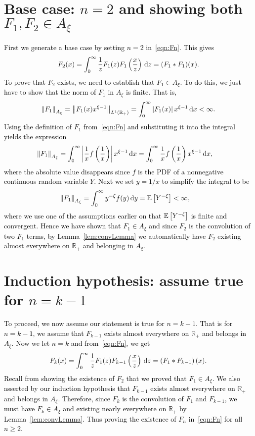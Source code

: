 \section{Base case: $n = 2$ and showing both $F_1, F_2 \in A_\xi$}
\textcolor{black}{
First we generate a base case by setting $n=2$ in~\eqref{eqn:Fn}. This gives
	\begin{equation*}
		F_2(x) = \int_0^\infty \frac{1}{z} F_1(z)F_1\left( \frac{x}{z}\right) \, \mathrm d z = (F_1 \ast F_1)(x).
	\end{equation*}
To prove that $F_2$ exists, we need to establish that $F_1 \in A_\xi$. To do this, we just have to show that the norm of $F_1$ in $A_\xi$ is finite. That is,
	$$
		\left\lVert F_1 \right\rVert_{A_\xi} = \left\lVert F_1(x)x^{\xi-1}\right\rVert_{L^1(\mathbb{R}_{+})} = \int_0^\infty \left| F_1(x) \right|x^{\xi-1} \, \mathrm d x < \infty.
	$$
Using the definition of $F_1$ from~\eqref{eqn:Fn} and substituting it into the integral yields the expression
	\begin{align*}
		\left\lVert F_1\right\rVert_{A_\xi} &= \int_0^\infty \left| \frac{1}{x}f\left( \frac{1}{x}\right) \right|x^{\xi-1} \, \mathrm d x =  \int_0^\infty \frac{1}{x}f\left(\frac{1}{x}\right)x^{\xi-1} \, \mathrm d x,
	\end{align*}
where the absolute value disappears since $f$ is the PDF of a nonnegative continuous random variable $Y$. Next we set $y = 1/x$ to simplify the integral to be
	\begin{align*}
		\left\lVert F_1\right\rVert_{A_\xi} &= \int_0^\infty y^{-\xi}f(y) \, \mathrm d y = \mathbb E\left[ Y^{-\xi}\right] < \infty,
	\end{align*}
where we use one of the assumptions earlier on that $\mathbb E\left[ Y^{-\xi} \right]$ is finite and convergent. Hence we have shown that $F_1 \in A_\xi$ and since $F_2$ is the convolution of two $F_1$ terms, by Lemma~\ref{lem:convLemma} we automatically have $F_2$ existing almost everywhere on $\mathbb{R_{+}}$ and belonging in $A_\xi$.
}
\section{Induction hypothesis: assume true for $n = k-1$}
\textcolor{black}{
To proceed, we now assume our statement is true for $n=k-1$. That is for $n=k-1$, we assume that $F_{k-1}$ exists almost everywhere on $\mathbb{R_{+}}$ and belongs in $A_\xi$. Now we let $n=k$ and from~\eqref{eqn:Fn}, we get
	$$
		F_k(x) = \int_0^\infty \frac{1}{z}F_1(z)F_{k-1}\left(\frac{x}{z}\right) \, \mathrm d z = \left( F_1 \ast F_{k-1} \right)(x).
	$$
Recall from showing the existence of $F_2$ that we proved that $F_1 \in A_\xi$. We also asserted by our induction hypothesis that $F_{k-1}$ exists almost everywhere on $\mathbb{R_{+}}$ and belongs in $A_\xi$. Therefore, since $F_k$ is the convolution of $F_1$ and $F_{k-1}$, we must have $F_k \in A_\xi$ and existing nearly everywhere on $\mathbb{R_{+}}$ by Lemma~\ref{lem:convLemma}. Thus proving the existence of $F_n$ in~\eqref{eqn:Fn} for all $n \geq 2$.}